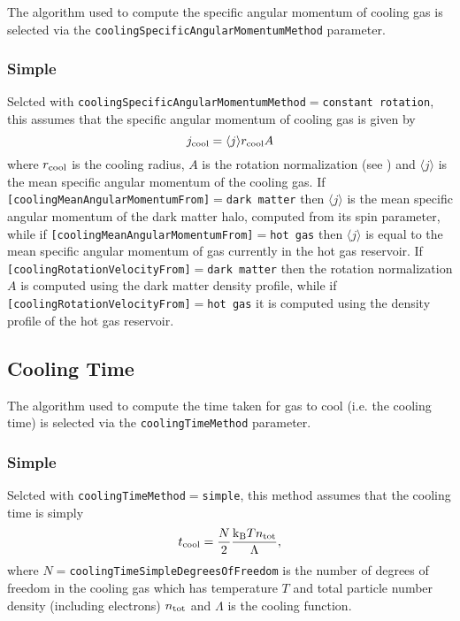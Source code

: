 The algorithm used to compute the specific angular momentum of cooling gas is selected via the {\tt coolingSpecificAngularMomentumMethod} parameter.

\subsubsection{Simple}

Selcted with {\tt coolingSpecificAngularMomentumMethod}$=${\tt constant rotation}, this assumes that the specific angular momentum of cooling gas is given by
\begin{equation}
 j_{\rm cool} = \langle j \rangle r_{\rm cool} A
\end{equation}
where $r_{\rm cool}$ is the cooling radius, $A$ is the rotation normalization (see ) and $\langle j \rangle$ is the mean specific angular momentum of the cooling gas. 
If {\tt [coolingMeanAngularMomentumFrom]}$=${\tt dark matter} then $\langle j \rangle$ is the mean specific angular momentum of the dark matter halo, computed from its spin parameter, while if {\tt [coolingMeanAngularMomentumFrom]}$=${\tt hot gas} then $\langle j \rangle$ is equal to the mean specific angular momentum of gas currently in the hot gas reservoir. If {\tt [coolingRotationVelocityFrom]}$=${\tt dark matter} then the rotation normalization $A$ is computed using the dark matter density profile, while if {\tt [coolingRotationVelocityFrom]}$=${\tt hot gas} it is computed using the density profile of the hot gas reservoir.

\subsection{Cooling Time}\label{sec:CoolingTime}

The algorithm used to compute the time taken for gas to cool (i.e. the cooling time) is selected via the {\tt coolingTimeMethod} parameter.

\subsubsection{Simple}

Selcted with {\tt coolingTimeMethod}$=${\tt simple}, this method assumes that the cooling time is simply
\begin{equation}
 t_{\rm cool} = {N \over 2} {{\rm k}_{\rm B} T n_{\rm tot} \over \Lambda},
\end{equation}
where $N=${\tt coolingTimeSimpleDegreesOfFreedom} is the number of degrees of freedom in the cooling gas which has temperature $T$ and total particle number density (including electrons) $n_{\rm tot}$ and $\Lambda$ is the cooling function.

